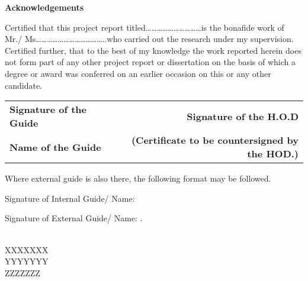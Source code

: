 \begin{center}
\thispagestyle{empty}
\LARGE{\textbf{Acknowledgements}}\\[1cm]
\end{center}
\linespread{1.13}
\large{Certified that this project report titled…………………………is the bonafide work of Mr./ Ms………………………………..who carried out the research under my supervision. Certified further, that to the best of my knowledge the work reported herein does not form part of any other project report or dissertation on the basis of which a degree or award was conferred on an earlier occasion on this or any other candidate.
	

\begin{table}[h]\large
\centering
\begin{tabular}{>{\bfseries}lc>{\bfseries}r}
Signature of the Guide & &  Signature of the H.O.D\\ %
Name of the Guide & & (Certificate to be countersigned by the HOD.)\\ %

\end{tabular}
\end{table}

 	           		        
	          

Where external guide is also there, the following format may be followed.

Signature of Internal Guide/
Name:

Signature of External Guide/
Name:
.}\\[3cm]
\large{\hspace*{4.5in} XXXXXXX}\\[0.25cm]
\large{\hspace*{4.5in} YYYYYYY}\\[0.25cm]
\large{\hspace*{4.5in} ZZZZZZZ}\\[0.25cm]
\newpage
